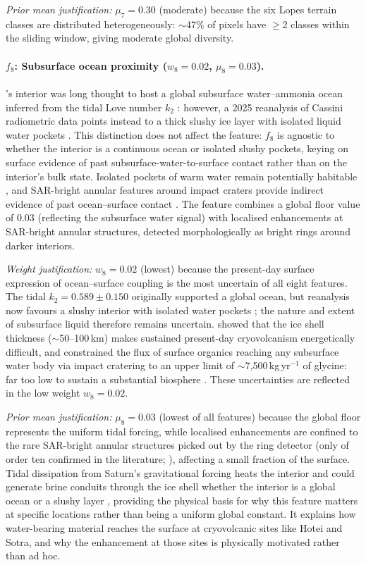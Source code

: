 \textit{Prior mean justification:} $\mu_7 = 0.30$ (moderate) because the six Lopes terrain classes are distributed heterogeneously: $\sim$47\% of pixels have $\geq$2 classes within the sliding window, giving moderate global diversity.

\paragraph{$f_8$: Subsurface ocean proximity ($w_8 = 0.02$, $\mu_8 = 0.03$).}
\titan{}'s interior was long thought to host a global subsurface water--ammonia ocean inferred from the tidal Love number $k_2$ \citep{Iess2012}: however, a 2025 reanalysis of Cassini radiometric data points instead to a thick slushy ice layer with isolated liquid water pockets \citep{Petricca2025}.  This distinction does not affect the feature: $f_8$ is agnostic to whether the interior is a continuous ocean or isolated slushy pockets, keying on surface evidence of past subsurface-water-to-surface contact rather than on the interior's bulk state.  Isolated pockets of warm water remain potentially habitable \citep{Affholder2025}, and SAR-bright annular features around impact craters provide indirect evidence of past ocean--surface contact \citep{Wood2010}.  The feature combines a global floor value of 0.03 (reflecting the subsurface water signal) with localised enhancements at SAR-bright annular structures, detected morphologically as bright rings around darker interiors.

\textit{Weight justification:} $w_8 = 0.02$ (lowest) because the present-day surface expression of ocean--surface coupling is the most uncertain of all eight features.  The tidal $k_2 = 0.589 \pm 0.150$ \citep{Iess2012} originally supported a global ocean, but reanalysis now favours a slushy interior with isolated water pockets \citep{Petricca2025}; the nature and extent of subsurface liquid therefore remains uncertain.  \citet{Hemingway2013} showed that the ice shell thickness ($\sim$50--100\,km) makes sustained present-day cryovolcanism energetically difficult, and \citet{Neish2024b} constrained the flux of surface organics reaching any subsurface water body via impact cratering to an upper limit of $\sim$7{,}500\,kg\,yr$^{-1}$ of glycine: far too low to sustain a substantial biosphere \citep{Affholder2025}.  These uncertainties are reflected in the low weight $w_8 = 0.02$.

\textit{Prior mean justification:} $\mu_8 = 0.03$ (lowest of all features) because the global floor represents the uniform tidal forcing, while localised enhancements are confined to the rare SAR-bright annular structures picked out by the ring detector (only of order ten confirmed in the literature; \citealt{Wood2010}), affecting a small fraction of the surface.  Tidal dissipation from Saturn's gravitational forcing heats the interior and could generate brine conduits through the ice shell whether the interior is a global ocean or a slushy layer \citep{Petricca2025}, providing the physical basis for why this feature matters at specific locations rather than being a uniform global constant.  It explains how water-bearing material reaches the surface at cryovolcanic sites like Hotei and Sotra, and why the enhancement at those sites is physically motivated rather than ad hoc.


